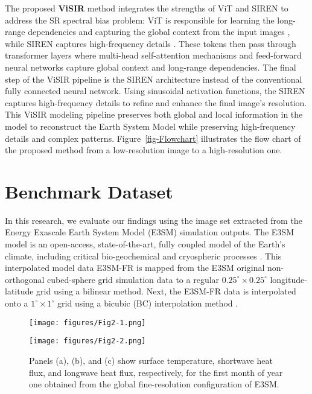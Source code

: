 \documentclass[pdflatex,sn-mathphys-num]{sn-jnl}%
\begin{document}
\noindent The proposed \textbf{ViSIR} method integrates the strengths of ViT and SIREN to address the SR spectral bias problem: ViT is responsible for learning the long-range dependencies and capturing the global context from the input images \cite{carion2020}, while SIREN captures high-frequency details \cite{SIREN}. These tokens then pass through transformer layers where multi-head self-attention mechanisms and feed-forward neural networks capture global context and long-range dependencies. The final step of the ViSIR pipeline is the SIREN architecture instead of the conventional fully connected neural network. Using sinusoidal activation functions, the SIREN captures high-frequency details to refine and enhance the final image's resolution. This ViSIR modeling pipeline preserves both global and local information in the model to reconstruct the Earth System Model while preserving high-frequency details and complex patterns. Figure~\ref{fig-Flowchart} illustrates the flow chart of the proposed method from a low-resolution image to a high-resolution one. 


\section{Benchmark Dataset}
\label{sec-data}

In this research, we evaluate our findings using the image set extracted from the Energy Exascale Earth System Model (E3SM) simulation outputs. The E3SM model is an open-access, state-of-the-art, fully coupled model of the Earth's climate, including critical bio-geochemical and cryospheric processes \cite{E3SM2018}. This interpolated model data E3SM-FR is mapped from the E3SM original non-orthogonal cubed-sphere grid simulation data to a regular $0.25^{\circ} \times 0.25^{\circ}$ longitude-latitude grid using a bilinear method. Next, the E3SM-FR data is interpolated onto a $1^{\circ} \times 1^{\circ}$ grid using a bicubic (BC) interpolation method \cite{Passarella2022}. 

\begin{figure}[!ht]
\centering
\begin{minipage}{0.49\linewidth} 
 \texttt{[image: figures/Fig2-1.png]} 
\end{minipage}
\hfill 
\begin{minipage}[t]{0.49\linewidth} 
 \raggedleft
 \texttt{[image: figures/Fig2-2.png]}
 \caption{Panels (a), (b), and (c) show surface temperature, shortwave heat flux, and longwave heat flux, respectively, for the first month of year one obtained from the global fine-resolution configuration of E3SM\cite{Nikhil2024}.}
 \label{fig-Motivation}
\end{minipage}
\end{figure}
\end{document}
